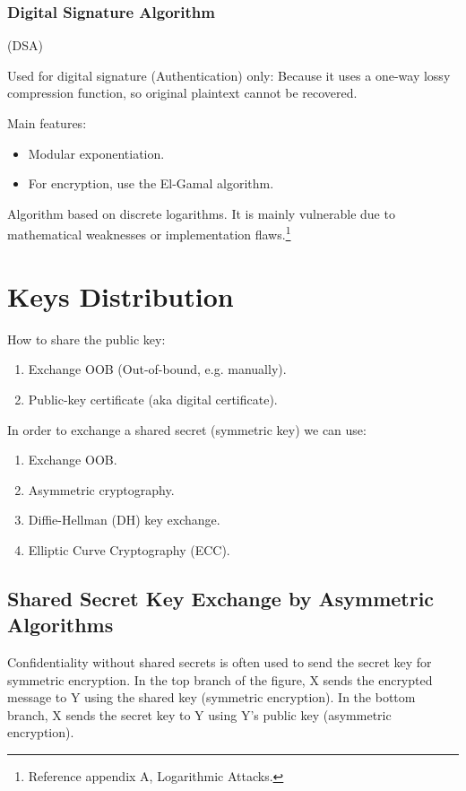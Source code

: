 \subsubsection{Digital Signature Algorithm}
\begin{center}
    (DSA)
\end{center}
Used for digital signature (Authentication) only: Because it uses a one-way lossy compression function, so original plaintext cannot be recovered.

Main features:
\begin{itemize}
    \item Modular exponentiation.
    \item For encryption, use the El-Gamal algorithm.
\end{itemize}

\begin{tcolorbox}[colback=red!10!white, colframe=red!70!black, coltitle=white, title=Beware]
    Algorithm based on discrete logarithms. It is mainly vulnerable due to mathematical weaknesses or implementation flaws.\footnote{Reference appendix A, Logarithmic Attacks.}
\end{tcolorbox}

\clearpage

\section{Keys Distribution}

\noindent How to share the public key:
\begin{enumerate}
    \item Exchange OOB (Out-of-bound, e.g. manually).
    \item Public-key certificate (aka digital certificate).
\end{enumerate}

In order to exchange a shared secret (symmetric key) we can use:
\begin{enumerate}
    \item Exchange OOB.
    \item Asymmetric cryptography.
    \item Diffie-Hellman (DH) key exchange.
    \item Elliptic Curve Cryptography (ECC).
\end{enumerate}

\subsection{Shared Secret Key Exchange by Asymmetric Algorithms}
Confidentiality without shared secrets is often used to send the secret key for symmetric encryption. In the top branch of the figure, X sends the encrypted message to Y using the shared key (symmetric encryption). In the bottom branch, X sends the secret key to Y using Y's public key (asymmetric encryption).

